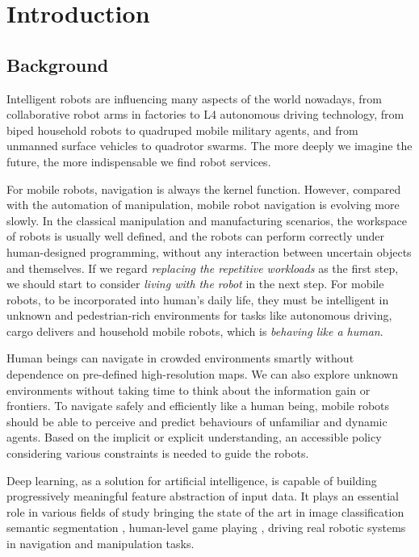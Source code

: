 \chapter{Introduction}

\section{Background}

Intelligent robots are influencing many aspects of the world nowadays, from collaborative robot arms in factories to L4 autonomous driving technology, from biped household robots to quadruped mobile military agents, and from unmanned surface vehicles to quadrotor swarms. The more deeply we imagine the future, the more indispensable we find robot services.

For mobile robots, navigation is always the kernel function. However, compared with the automation of manipulation, mobile robot navigation is evolving more slowly. In the classical manipulation and manufacturing scenarios, the workspace of robots is usually well defined, and the robots can perform correctly under human-designed programming, without any interaction between uncertain objects and themselves. If we regard \textit{replacing the repetitive workloads} as the first step, we should start to consider \textit{living with the robot} in the next step. For mobile robots, to be incorporated into human's daily life, they must be intelligent in unknown and pedestrian-rich environments for tasks like autonomous driving, cargo delivers and household mobile robots, which is \textit{behaving like a human}.

Human beings can navigate in crowded environments smartly without dependence on pre-defined high-resolution maps. We can also explore unknown environments without taking time to think about the information gain or frontiers. To navigate safely and efficiently like a human being, mobile robots should be able to perceive and predict behaviours of unfamiliar and dynamic agents. Based on the implicit or explicit understanding, an accessible policy considering various constraints is needed to guide the robots.


Deep learning, as a solution for artificial intelligence, is capable of building progressively meaningful feature abstraction of input data.
It plays an essential role in various fields of study bringing the state of the art in image classification 
semantic segmentation ,
human-level game playing , driving real robotic systems in navigation 
and manipulation  tasks.

